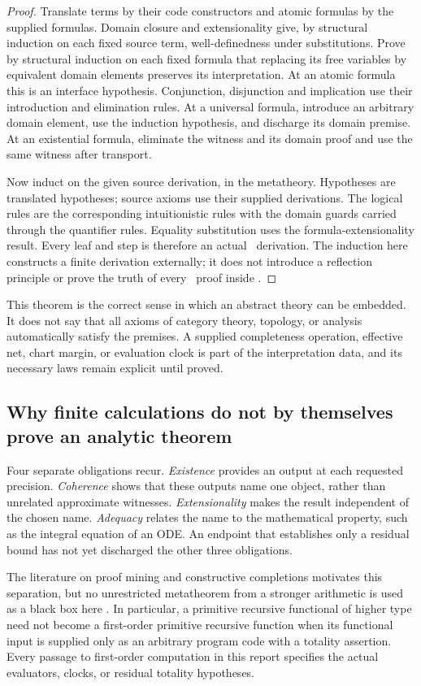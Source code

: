 \begin{proof}
Translate terms by their code constructors and atomic formulas by the supplied
formulas. Domain closure and extensionality give, by structural induction on
each fixed source term, well-definedness under substitutions. Prove by
structural induction on each fixed formula that replacing its free variables
by equivalent domain elements preserves its interpretation. At an atomic
formula this is an interface hypothesis. Conjunction, disjunction and
implication use their introduction and elimination rules. At a universal
formula, introduce an arbitrary domain element, use the induction hypothesis,
and discharge its domain premise. At an existential formula, eliminate the
witness and its domain proof and use the same witness after transport.

Now induct on the given source derivation, in the metatheory. Hypotheses are
translated hypotheses; source axioms use their supplied derivations. The
logical rules are the corresponding intuitionistic rules with the domain
guards carried through the quantifier rules. Equality substitution uses the
formula-extensionality result. Every leaf and step is therefore an actual
\ipra\ derivation. The induction here constructs a finite derivation externally;
it does not introduce a reflection principle or prove the truth of every
\ipra\ proof inside \ipra.
\end{proof}

This theorem is the correct sense in which an abstract theory can be embedded.
It does not say that all axioms of category theory, topology, or analysis
automatically satisfy the premises. A supplied completeness operation,
effective net, chart margin, or evaluation clock is part of the interpretation
data, and its necessary laws remain explicit until proved.

\subsection{Why finite calculations do not by themselves prove an analytic theorem}

Four separate obligations recur. \emph{Existence} provides an output at each
requested precision. \emph{Coherence} shows that these outputs name one
object, rather than unrelated approximate witnesses. \emph{Extensionality}
makes the result independent of the chosen name. \emph{Adequacy} relates the
name to the mathematical property, such as the integral equation of an ODE.
An endpoint that establishes only a residual bound has not yet discharged
the other three obligations.

The literature on proof mining and constructive completions motivates this
separation, but no unrestricted metatheorem from a stronger arithmetic is used
as a black box here \cite{oconnor2007,kohlenbach-oliva,avigad-feferman}.
In particular, a primitive recursive functional of higher type need not
become a first-order primitive recursive function when its functional input
is supplied only as an arbitrary program code with a totality assertion.
Every passage to first-order computation in this report specifies the
actual evaluators, clocks, or residual totality hypotheses.
